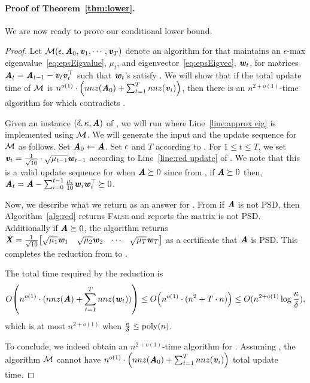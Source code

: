 \paragraph{Proof of Theorem~\ref{thm:lower}.} 
We are now ready to prove our conditional lower bound.
\begin{proof} 
Let $\calM(\epsilon,\AA_0,\vv_1,\cdots,\vv_T)$ denote an algorithm for  that maintains an $\epsilon$-max eigenvalue~\eqref{eq:epsEigvalue}, $\mu_t$, and eigenvector~\eqref{eq:epsEigvec}, $\ww_t$, for matrices $\AA_t = \AA_{t-1}-\vv_t\vv_t^{\top}$ such that $\ww_t$'s satisfy . We will show that if the total update time of $\calM$ is $n^{o(1)}\cdot \left(nnz(\AA_0) + \sum_{t=1}^T nnz(\vv_i)\right)$, then there is an $n^{2+o(1)}$-time algorithm for  which contradicts .


Given an instance $(\delta,\kappa,\AA)$ of , 
we will run  where Line~\ref{line:approx eig} is implemented using $\calM$. We will generate the input and the update sequence for $\calM$ as follows.
Set $\AA_0 \gets \AA$. Set $\eps$ and $T$ according to . For $1\le t\le T$, we set $\vv_t = \frac{1}{\sqrt{10}}\cdot \sqrt{\mu_{t-1}} \ww_{t-1}$ according to Line~\ref{line:red update} of . We note that this is a valid update sequence for  when $\AA\succeq 0$ since from , 
 if $\AA\succeq 0$ then, $\AA_t = \AA - \sum_{i=0}^{t-1}\frac{\mu_i}{10}\ww_i\ww_i^{\top}\succeq 0$. 

Now, we describe what we return as an answer for .  From  if $\AA$ is not PSD, then Algorithm~\ref{alg:red} returns \textsc{False} and reports the matrix is not PSD. Additionally if $\AA\succeq 0$, the algorithm returns $\XX=\frac{1}{\sqrt{10}}\begin{bmatrix}\sqrt{\mu_1}\ww_1 & \sqrt{\mu_2}\ww_2 & \cdots & \sqrt{\mu_T}\ww_T\end{bmatrix}$ as a certificate that $\AA$ is PSD. This completes the reduction from  to .

The total time required by the reduction is 
\[
O\left(n^{o(1)}\cdot (nnz(\AA) + \sum_{t=1}^T nnz(\ww_t))\right) \leq O\left(n^{o(1)}\cdot (n^2 + T\cdot n)\right) \leq O(n^{2+o(1)}\log\frac{\kappa}{\delta}),
\]
which is at most $n^{2+o(1)}$ when $\frac{\kappa}{\delta} \leq \poly(n)$. 

To conclude, we indeed obtain an $n^{2+o(1)}$-time algorithm for . Assuming , the algorithm $\calM$ cannot have $n^{o(1)}\cdot \left(nnz(\AA_0) + \sum_{t=1}^T nnz(\vv_i)\right)$ total update time.
\end{proof}








